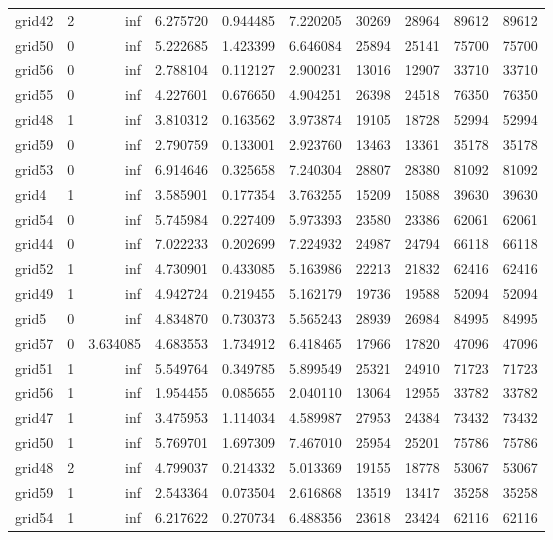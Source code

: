 \begin{longtable}{|l|r|r|r|r|r|r|r|r|r|}
grid42 & 2 & inf & 6.275720 & 0.944485 & 7.220205 & 30269 & 28964 & 89612 & 89612 \\
grid50 & 0 & inf & 5.222685 & 1.423399 & 6.646084 & 25894 & 25141 & 75700 & 75700 \\
grid56 & 0 & inf & 2.788104 & 0.112127 & 2.900231 & 13016 & 12907 & 33710 & 33710 \\
grid55 & 0 & inf & 4.227601 & 0.676650 & 4.904251 & 26398 & 24518 & 76350 & 76350 \\
grid48 & 1 & inf & 3.810312 & 0.163562 & 3.973874 & 19105 & 18728 & 52994 & 52994 \\
grid59 & 0 & inf & 2.790759 & 0.133001 & 2.923760 & 13463 & 13361 & 35178 & 35178 \\
grid53 & 0 & inf & 6.914646 & 0.325658 & 7.240304 & 28807 & 28380 & 81092 & 81092 \\
grid4 & 1 & inf & 3.585901 & 0.177354 & 3.763255 & 15209 & 15088 & 39630 & 39630 \\
grid54 & 0 & inf & 5.745984 & 0.227409 & 5.973393 & 23580 & 23386 & 62061 & 62061 \\
grid44 & 0 & inf & 7.022233 & 0.202699 & 7.224932 & 24987 & 24794 & 66118 & 66118 \\
grid52 & 1 & inf & 4.730901 & 0.433085 & 5.163986 & 22213 & 21832 & 62416 & 62416 \\
grid49 & 1 & inf & 4.942724 & 0.219455 & 5.162179 & 19736 & 19588 & 52094 & 52094 \\
grid5 & 0 & inf & 4.834870 & 0.730373 & 5.565243 & 28939 & 26984 & 84995 & 84995 \\
grid57 & 0 & 3.634085 & 4.683553 & 1.734912 & 6.418465 & 17966 & 17820 & 47096 & 47096 \\
grid51 & 1 & inf & 5.549764 & 0.349785 & 5.899549 & 25321 & 24910 & 71723 & 71723 \\
grid56 & 1 & inf & 1.954455 & 0.085655 & 2.040110 & 13064 & 12955 & 33782 & 33782 \\
grid47 & 1 & inf & 3.475953 & 1.114034 & 4.589987 & 27953 & 24384 & 73432 & 73432 \\
grid50 & 1 & inf & 5.769701 & 1.697309 & 7.467010 & 25954 & 25201 & 75786 & 75786 \\
grid48 & 2 & inf & 4.799037 & 0.214332 & 5.013369 & 19155 & 18778 & 53067 & 53067 \\
grid59 & 1 & inf & 2.543364 & 0.073504 & 2.616868 & 13519 & 13417 & 35258 & 35258 \\
grid54 & 1 & inf & 6.217622 & 0.270734 & 6.488356 & 23618 & 23424 & 62116 & 62116 \\

\end{longtable}
